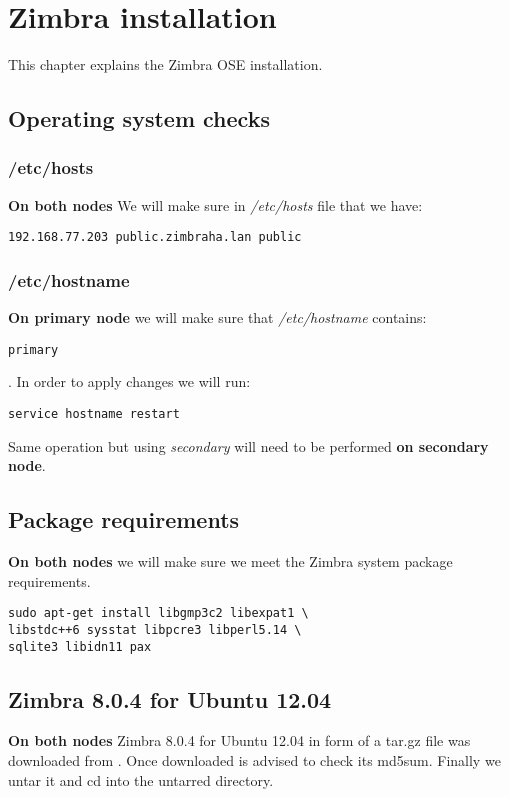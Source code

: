 

\chapter{Zimbra installation}
\label{chap:zimbra-installation}
This chapter explains the Zimbra OSE installation.

\section {Operating system checks}
\subsection {/etc/hosts}
\textbf{On both nodes}
We will make sure in \textit{/etc/hosts} file that we have:

\begin{verbatim}
192.168.77.203 public.zimbraha.lan public
\end{verbatim}
\subsection {/etc/hostname}
\textbf{On primary node} we will make sure that \textit{/etc/hostname} contains:

\begin{verbatim}
primary
\end{verbatim}
. In order to apply changes we will run:
\begin{verbatim}
service hostname restart
\end{verbatim}

Same operation but using \textit{secondary} will need to be performed \textbf{on secondary node}.

\section {Package requirements}
\textbf{On both nodes} we will make sure we meet the Zimbra system package requirements.

\begin{verbatim}
sudo apt-get install libgmp3c2 libexpat1 \
libstdc++6 sysstat libpcre3 libperl5.14 \
sqlite3 libidn11 pax
\end{verbatim}

\section {Zimbra 8.0.4 for Ubuntu 12.04}
\textbf{On both nodes}
Zimbra 8.0.4 for Ubuntu 12.04 in form of a tar.gz file was downloaded from \cite{Zimbra8Download}.
Once downloaded is advised to check its md5sum. Finally we untar it and cd into the untarred directory.

